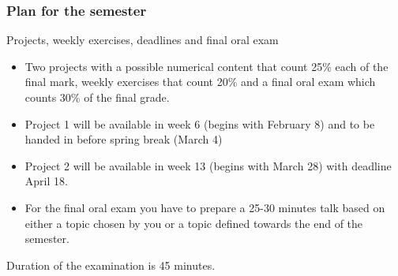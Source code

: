 \documentclass{beamer}
\begin{document}
\begin{frame}
\frametitle{Plan for the semester}

\begin{block}{Projects, weekly exercises, deadlines and final oral exam }
\begin{itemize}
\item Two  projects with a possible numerical content that count 25\% each of the final mark, weekly exercises  that count 20\% and a final oral exam which counts 30\% of the final grade. 

\item Project 1 will be available in week 6 (begins with February 8) and to be handed in before spring break (March 4)

\item Project 2 will be available in week 13 (begins with March 28) with deadline April 18.

\item For the final oral exam you have to prepare a 25-30 minutes talk based on either a topic chosen by you or a topic defined towards the end of the semester.
\end{itemize}

\noindent
Duration of the examination is 45 minutes. 
\end{block}
\end{frame}
\end{document}
